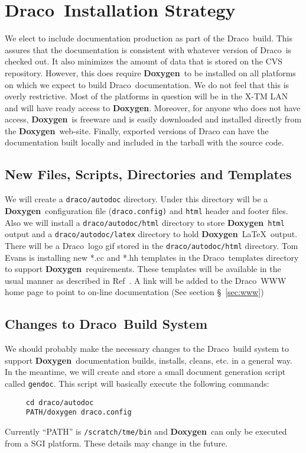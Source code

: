 \documentclass[11pt]{nmemo}
\newcommand{\draco}{{\normalfont\sffamily Draco}}
\newcommand{\doxy}{{\normalfont\bfseries Doxygen}}
\begin{document}

\section{\draco\ Installation Strategy}
\label{sec:draco}

We elect to include documentation
production as part of the \draco\ build. This assures that the
documentation is consistent with whatever version of \draco\ is
checked out. It also minimizes the amount of data that is stored on
the CVS repository. However, this does require
\doxy\ to be installed on all platforms on which we expect to build
\draco\ documentation.  We do not feel that this is overly restrictive.
Most of the platforms in question will be in the X-TM LAN and will have ready 
access to \doxy. Moreover, for anyone who does not
have access, \doxy\ is freeware and is easily downloaded and
installed directly from the \doxy\ web-site.
Finally, exported versions of Draco can have the documentation
built locally and included in the tarball with the source code. 

\subsection{New Files, Scripts, Directories and Templates}
We will create a \texttt{draco/autodoc} directory. Under this directory
will be a \doxy\ configuration file (\texttt{draco.config)} and
 \texttt{html} header and footer files. Also we will install 
a \texttt{draco/autodoc/html} directory to store \doxy\ \texttt{html}
output and a \texttt{draco/autodoc/latex}
directory to hold \doxy\ \LaTeX\ output. There will be a \draco\ logo gif
stored in the \texttt{draco/autodoc/html} directory. 
Tom Evans is installing new *.cc and *.hh templates in the \draco\ 
templates directory to support \doxy\ requirements. These templates
will be available in the usual manner as described in Ref~\cite{xtm:9909}.
A link will be added to the \draco\ WWW home page to point to on-line
documentation (See section \S~\ref{sec:www})

\subsection{Changes to \draco\ Build System}

We should probably make the necessary changes to the \draco\
build system to support \doxy\ documentation builds, installs, cleans,
etc. in a general way. In the meantime, 
we will create and store a small document generation 
script called \texttt{gendoc}. This 
script will basically execute the following commands:
\begin{verbatim} 
     cd draco/autodoc
     PATH/doxygen draco.config
\end{verbatim}
Currently ``PATH'' is \texttt{/scratch/tme/bin} and \doxy\
can only be executed from a SGI platform. These details may
change in the future. 
\end{document}
